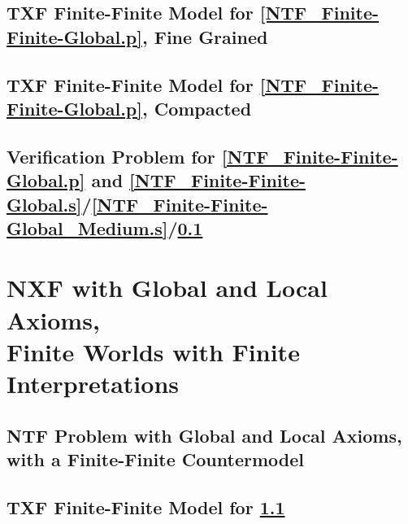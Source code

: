 \documentclass{easychair}
\begin{document}
\newpage
\subsection{TXF Finite-Finite Model for \ref{NTF_Finite-Finite-Global.p}, Fine Grained}
\label{NTF_Finite-Finite-Global_Fine.s}
\begin{small}

\end{small}

\newpage
\subsection{TXF Finite-Finite Model for \ref{NTF_Finite-Finite-Global.p}, Compacted}
\label{NTF_Finite-Finite-Global_Compact.s}
\begin{small}

\end{small}

\newpage
\subsection{Verification Problem for \ref{NTF_Finite-Finite-Global.p} and 
\ref{NTF_Finite-Finite-Global.s}/\ref{NTF_Finite-Finite-Global_Medium.s}/\ref{NTF_Finite-Finite-Global_Fine.s}}
\label{NTF_Finite-Finite-Global.s.p}
\begin{small}

\end{small}

\newpage
\section{NXF with Global and Local Axioms, \\
         Finite Worlds with Finite Interpretations}
\label{NXFLocal}

\subsection{NTF Problem with Global and Local Axioms, \\
            with a Finite-Finite Countermodel}
\label{NTF_Finite-Finite-Local.p}
\begin{small}

\end{small}

\newpage
\subsection{TXF Finite-Finite Model for \ref{NTF_Finite-Finite-Local.p}}
\label{NTF_Finite-Finite-Local.s}
\begin{small}

\end{small}
\end{document}

